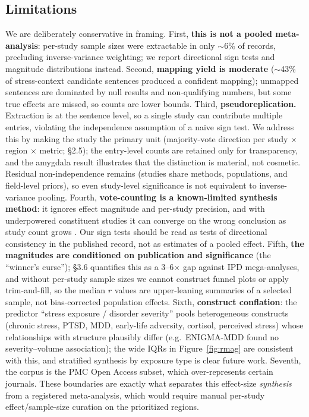 \documentclass[11pt]{article}
\begin{document}
\subsection{Limitations}
We are deliberately conservative in framing. First, \textbf{this is not a pooled
meta-analysis}: per-study sample sizes were extractable in only $\sim$6\% of
records, precluding inverse-variance weighting; we report directional sign tests
and magnitude distributions instead. Second, \textbf{mapping yield is moderate}
($\sim$43\% of stress-context candidate sentences produced a confident mapping);
unmapped sentences are dominated by null results and non-qualifying numbers, but
some true effects are missed, so counts are lower bounds. Third,
\textbf{pseudoreplication.} Extraction is at the sentence level, so a single
study can contribute multiple entries, violating the independence assumption of a
naïve sign test. We address this by making the study the primary unit
(majority-vote direction per study $\times$ region $\times$ metric; \S2.5); the
entry-level counts are retained only for transparency, and the amygdala result
illustrates that the distinction is material, not cosmetic. Residual
non-independence remains (studies share methods, populations, and field-level
priors), so even study-level significance is not equivalent to inverse-variance
pooling. Fourth, \textbf{vote-counting is a known-limited synthesis method}: it
ignores effect magnitude and per-study precision, and with underpowered
constituent studies it can converge on the wrong conclusion as study count grows
\cite{hedges1985,borenstein2009}. Our sign tests should be read as tests of
directional consistency in the published record, not as estimates of a pooled
effect. Fifth, \textbf{the magnitudes are conditioned on publication and
significance} (the ``winner's curse''); \S3.6 quantifies this as a 3--6$\times$
gap against IPD mega-analyses, and without per-study sample sizes we cannot
construct funnel plots or apply trim-and-fill, so the median $r$ values are
upper-leaning summaries of a selected sample, not bias-corrected population
effects. Sixth, \textbf{construct conflation}: the predictor ``stress exposure /
disorder severity'' pools heterogeneous constructs (chronic stress, PTSD, MDD,
early-life adversity, cortisol, perceived stress) whose relationships with
structure plausibly differ (e.g.\ ENIGMA-MDD found no severity--volume
association); the wide IQRs in Figure~\ref{fig:rmag} are consistent with this,
and stratified synthesis by exposure type is clear future work. Seventh, the
corpus is the PMC Open Access subset, which over-represents certain journals.
These boundaries are exactly what separates this effect-size \emph{synthesis}
from a registered meta-analysis, which would require manual per-study
effect/sample-size curation on the prioritized regions.
\end{document}
